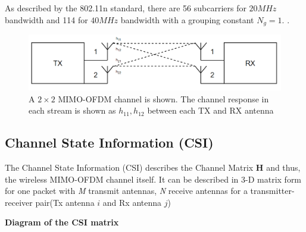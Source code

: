 As described by the 802.11n standard, there are 56 subcarriers for $20MHz$ bandwidth and 114 for $40MHz$ bandwidth with a grouping constant $N_g = 1$.  \citep{full802.11nStandard}.
\begin{figure}[h]
\begin{center}
  \includegraphics[scale=0.5]{Figures/MIMO2.PNG}
\end{center}
  \caption{A $2\times 2$ MIMO-OFDM channel is shown. The channel response in each stream is shown as $h_{11}, h_{12}$ between each TX and RX antenna}
  \vspace{-10pt}
  \label{fig:MIMO-OFDM}
\end{figure}
\subsection{Channel State Information (CSI)}
The Channel State Information (CSI) describes the Channel Matrix \textbf{H} and thus, the wireless MIMO-OFDM channel itself. It can be described in 3-D matrix form for one packet with \textit{M} transmit antennas, \textit{N} receive antennas for a transmitter-receiver pair(Tx antenna $i$ and Rx antenna $j$)

\textbf{Diagram of the CSI matrix}

